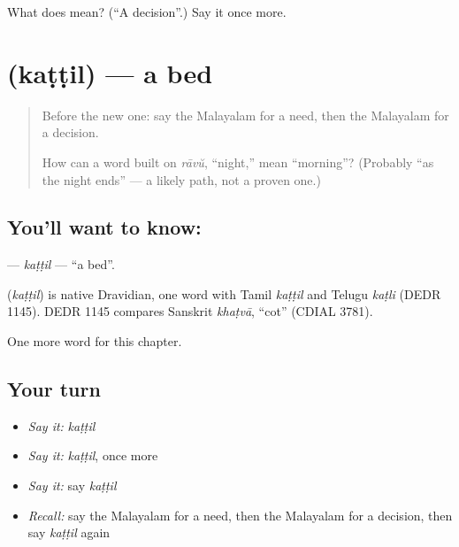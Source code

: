 \begin{tcolorbox}[breakable,colback=teal!4,colframe=teal!35!black,title={Before you move on}]
What does  mean? (\textquotedblleft{}A decision\textquotedblright{}.) Say it once more.
\end{tcolorbox}
\section[\texorpdfstring{\ml{കട്ടിൽ} (kaṭṭil)}{കട്ടിൽ (kaṭṭil)}]{ (kaṭṭil) — a bed}

\label{lesson:ML-C146-kattil}



\begin{quote}
Before the new one: say the Malayalam for a need, then the Malayalam for a decision.

How can a word built on \emph{rāvŭ}, \textquotedblleft{}night,\textquotedblright{} mean \textquotedblleft{}morning\textquotedblright{}? (Probably \textquotedblleft{}as the night ends\textquotedblright{} — a likely path, not a proven one.)
\end{quote}

\subsection*{You'll want to know: }
\textbf{} — \emph{kaṭṭil} — \textquotedblleft{}a bed\textquotedblright{}.

\begin{cousinweb}
\textbf{} (\emph{kaṭṭil}) is native Dravidian, one word with Tamil \emph{kaṭṭil} and Telugu \emph{kaṭli} (DEDR 1145). DEDR 1145 compares Sanskrit \emph{khaṭvā}, \textquotedblleft{}cot\textquotedblright{} (CDIAL 3781).
\end{cousinweb}

\begin{grammarlens}[title={What you've built}]
One more word for this chapter.
\end{grammarlens}

\subsection*{Your turn}
\begin{itemize}
\raggedright
  \item \emph{Say it:} \emph{kaṭṭil}
  \item \emph{Say it:} \emph{kaṭṭil}, once more
  \item \emph{Say it:} say \emph{kaṭṭil}
  \item \emph{Recall:} say the Malayalam for a need, then the Malayalam for a decision, then say \emph{kaṭṭil} again
\end{itemize}

